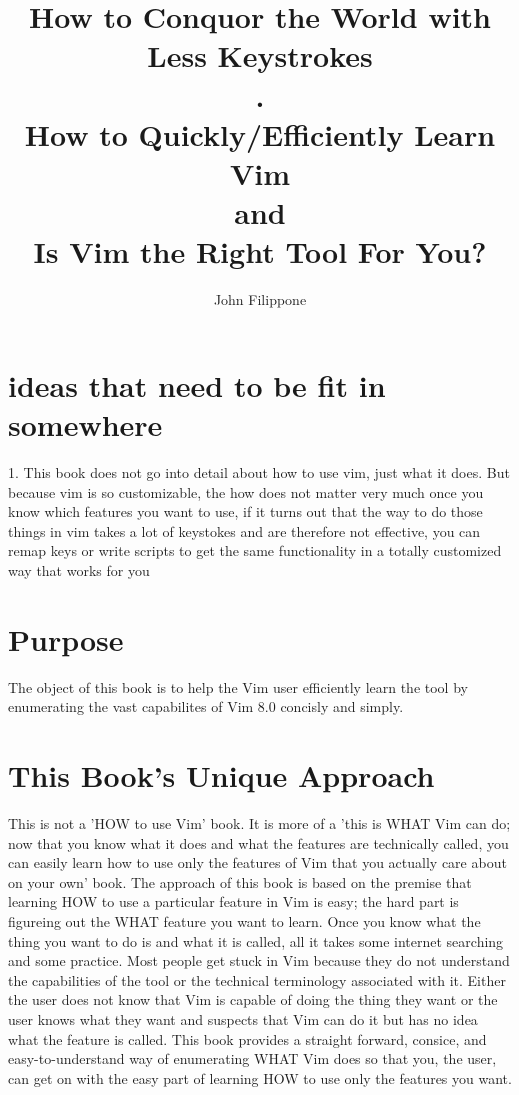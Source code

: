 \documentclass[12pt]{book}
\title{How to Conquor the World with Less Keystrokes \\.\\\large How to Quickly/Efficiently Learn Vim \\\large and \\\large Is Vim the Right Tool For You?}
\author{John Filippone}
\begin{document}
\maketitle

\section{ideas that need to be fit in somewhere}
1. This book does not go into detail about how to use vim, just what it does.  
But because vim is so customizable, the how does not matter very much
once you know which features you want to use, if it turns out that the way to do those things in vim takes a lot of keystokes and are therefore
not effective, you can remap keys or write scripts to get the same functionality in a totally customized way that works for you

\section{Purpose}
The object of this book is to help the Vim user efficiently learn the tool by enumerating the vast capabilites of Vim 8.0 concisly and simply.  

\section{This Book's Unique Approach}
This is not a 'HOW to use Vim' book. 
It is more of a 'this is WHAT Vim can do; now that you know what it does and what the features are technically called, you can easily learn how to use only the features of Vim 
that you actually care about on your own' book. 
The approach of this book is based on the premise that learning HOW to use a particular feature in Vim is easy; the hard part is figureing out the WHAT feature you want to learn.  
Once you know what the thing you want to do is and what it is called, all it takes some internet searching and some practice.  
Most people get stuck in Vim because they do not understand the capabilities of the tool or the technical terminology associated with it.
Either the user does not know that Vim is capable of doing the thing they want or the user knows what they want and suspects that Vim can do it but has no idea what the feature is called.
This book provides a straight forward, consice, and easy-to-understand way of enumerating WHAT Vim does so that you, the user, can get on with the easy part of learning HOW to use only the
features you want.  
 
\end{document}

